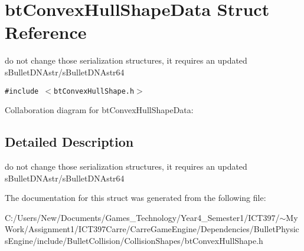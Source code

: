 \hypertarget{structbt_convex_hull_shape_data}{
\section{btConvexHullShapeData Struct Reference}
\label{structbt_convex_hull_shape_data}
}
do not change those serialization structures, it requires an updated sBulletDNAstr/sBulletDNAstr64  


{\tt \#include $<$btConvexHullShape.h$>$}

Collaboration diagram for btConvexHullShapeData:

\subsection{Detailed Description}
do not change those serialization structures, it requires an updated sBulletDNAstr/sBulletDNAstr64 

The documentation for this struct was generated from the following file:\begin{CompactItemize}
\item 
C:/Users/New/Documents/Games\_\-Technology/Year4\_\-Semester1/ICT397/$\sim$My Work/Assignment1/ICT397Carre/CarreGameEngine/Dependencies/BulletPhysicsEngine/include/BulletCollision/CollisionShapes/btConvexHullShape.h\end{CompactItemize}
